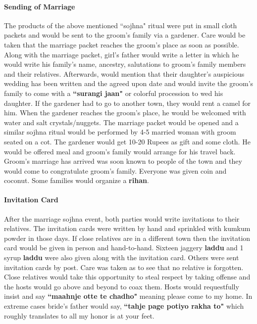 \paragraph{Sending of Marriage} The products of the above mentioned ``sojhna"
ritual were put in small cloth packets and would be sent to the groom's family
via a gardener. Care would be taken that the marriage packet reaches the
groom's place as soon as possible. Along with the marriage packet, girl's
father would write a letter in which he would write his family's name,
ancestry, salutations to groom's family members and their relatives.
Afterwards, would mention that their daughter's auspicious wedding has been
written and the agreed upon date and would invite the groom's family to come
with a \textbf{``surangi jaan"} or colorful procession to wed his daughter. If
the gardener had to go to another town, they would rent a camel for him. When
the gardener reaches the groom's place, he would be welcomed with water and
salt crystals/nuggets. The marriage packet would be opened and a similar sojhna
ritual would be performed by 4-5 married woman with groom seated on a cot. The
gardener would get 10-20 Rupees as gift and some cloth. He would be offered
meal and groom's family would arrange for his travel back. Groom's marriage has
arrived was soon known to people of the town and they would come to
congratulate groom's family. Everyone was given coin and coconut. Some families
would organize a \textbf{rihan}.

\paragraph{Invitation Card} After the marriage sojhna event, both parties would
write invitations to their relatives. The invitation cards were written by hand
and sprinkled with kumkum powder in those days. If close relatives are in a
different town then the invitation card would be given in person and
hand-to-hand. Sixteen jaggery \textbf{laddu} and 1 syrup \textbf{laddu} were
also given along with the invitation card. Others were sent invitation cards by
post. Care was taken as to see that no relative is forgotten. Close relatives
would take this opportunity to steal respect by taking offense and the hosts
would go above and beyond to coax them. Hosts would requestfully insist and say
\textbf{``maahnje otte te chadho"} meaning please come to my home. In extreme
cases bride's father would say, \textbf{``tahje page potiyo rakha to"} which
roughly translates to all my honor is at your feet.

